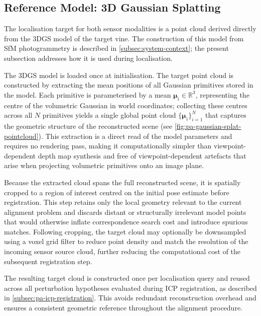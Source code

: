 \subsection{Reference Model: 3D Gaussian Splatting}
\label{subsec:pa-reference-model}

The localisation target for both sensor modalities is a point cloud derived directly from the 3DGS model of the target vine. The construction of this model from SfM photogrammetry is described in \cref{subsec:system-context}; the present subsection addresses how it is used during localisation.

The 3DGS model is loaded once at initialisation. The target point cloud is constructed by extracting the mean positions of all Gaussian primitives stored in the model. Each primitive is parameterised by a mean $\boldsymbol{\mu}_i \in \mathbb{R}^3$, representing the centre of the volumetric Gaussian in world coordinates; collecting these centres across all $N$ primitives yields a single global point cloud $\{\boldsymbol{\mu}_i\}_{i=1}^{N}$ that captures the geometric structure of the reconstructed scene (see \cref{fig:pa-gaussian-splat-pointcloud}). This extraction is a direct read of the model parameters and requires no rendering pass, making it computationally simpler than viewpoint-dependent depth map synthesis and free of viewpoint-dependent artefacts that arise when projecting volumetric primitives onto an image plane.

Because the extracted cloud spans the full reconstructed scene, it is spatially cropped to a region of interest centred on the initial pose estimate before registration. This step retains only the local geometry relevant to the current alignment problem and discards distant or structurally irrelevant model points that would otherwise inflate correspondence search cost and introduce spurious matches. Following cropping, the target cloud may optionally be downsampled using a voxel grid filter to reduce point density and match the resolution of the incoming sensor source cloud, further reducing the computational cost of the subsequent registration step.

The resulting target cloud is constructed once per localisation query and reused across all perturbation hypotheses evaluated during ICP registration, as described in \cref{subsec:pa-icp-registration}. This avoids redundant reconstruction overhead and ensures a consistent geometric reference throughout the alignment procedure.

